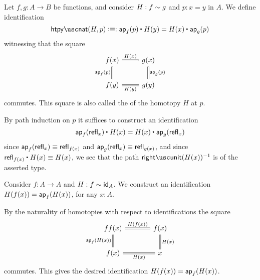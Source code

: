 \begin{defn}\label{defn:htpy_nat}
Let $f,g:A\to B$ be functions, and consider $H:f\htpy g$ and $p:x=y$ in $A$. We define identification
\begin{equation*}
\htpynat(H,p) \defeq  :\ct{\ap{f}{p}}{H(y)}=\ct{H(x)}{\ap{g}{p}}
\end{equation*}
witnessing that the square
\begin{equation*}
\begin{tikzcd}
f(x) \arrow[r,equals,"H(x)"] \arrow[d,equals,swap,"\ap{f}{p}"] & g(x) \arrow[d,equals,"\ap{g}{p}"] \\
f(y) \arrow[r,equals,swap,"H(y)"] & g(y)
\end{tikzcd}
\end{equation*}
commutes. This square is also called the  of the homotopy $H$ at $p$.
\end{defn}

\begin{constr}
  By path induction on $p$ it suffices to construct an identification
  \begin{equation*}
    \ct{\ap{f}{\refl{x}}}{H(x)}=\ct{H(x)}{\ap{g}{\refl{x}}}
  \end{equation*}
  since $\ap{f}{\refl{x}}\jdeq \refl{f(x)}$ and $\ap{g}{\refl{x}}\jdeq\refl{g(x)}$, and since $\ct{\refl{f(x)}}{H(x)}\jdeq H(x)$, we see that the path $\rightunit(H(x))^{-1}$ is of the asserted type.
\end{constr}

\begin{defn}\label{defn:retraction_swap}
Consider $f:A\to A$ and $H: f\htpy \idfunc[A]$. We construct an identification $H(f(x))=\ap{f}{H(x)}$, for any $x:A$.
\end{defn}

\begin{constr}
By the naturality of homotopies with respect to identifications the square
\begin{equation*}
\begin{tikzcd}[column sep=large]
ff(x) \arrow[d,swap,equals,"\ap{f}{H(x)}"] \arrow[r,equals,"H(f(x))"] & f(x) \arrow[d,equals,"H(x)"] \\
f(x) \arrow[r,swap,equals,"H(x)"] & x
\end{tikzcd}
\end{equation*}
commutes. This gives the desired identification $H(f(x))=\ap{f}{H(x)}$.
\end{constr}

